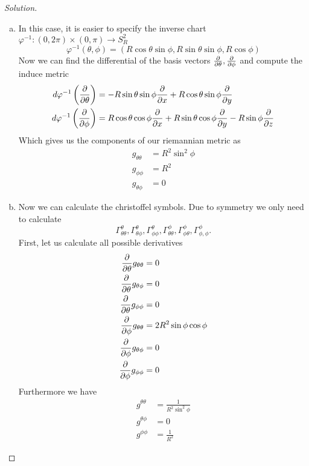 \documentclass[a4paper]{article}
\begin{document}
\begin{proof}[Solution]
  \begin{enumerate}[(a)]
    \item In this case, it is easier to specify the inverse chart $\varphi^{-1}: (0, 2\pi) \times (0, \pi) \rightarrow S_R^2$
      \[
        \varphi^{-1}(\theta, \phi) = (R \cos \theta \sin \phi, R \sin \theta \sin \phi, R \cos \phi)
      \]
  Now we can find the differential of the basis vectors $ \pdv{\theta}, \pdv{\phi}$ and compute the induce metric
  \[
    \begin{aligned}
      d\varphi^{-1} \left( \pdv{\theta} \right) &= -R \sin \theta \sin \phi \pdv{x} + R \cos \theta \sin \phi \pdv{y} \\
      d \varphi^{-1} \left( \pdv{\phi} \right) &= R \cos \theta \cos \phi \pdv{x} + R \sin \theta \cos \phi \pdv{y} - R \sin \phi \pdv{z}
    \end{aligned}
  \]
  Which gives us the components of our riemannian metric as
  \[
    \begin{aligned}
      g_{\theta \theta} &= R^2\sin^2 \phi \\
      g_{\phi \phi} &= R^2  \\
      g_{\theta \phi} &= 0
    \end{aligned}
  \]
\item  
  Now we can calculate the christoffel symbols. Due to symmetry we only need to calculate 
  \[
    \Gamma_{\theta \theta}^\theta, \Gamma_{\theta \phi}^\theta, \Gamma_{\phi \phi}^\theta, \Gamma_{\theta \theta}^\phi, \Gamma_{\phi \theta}^{\phi}, \Gamma_{\phi, \phi}^\phi.
  \] First, let us calculate all possible derivatives
  \[
    \begin{aligned}
      \pdv{\theta} g_{\theta \theta} &= 0 \\
      \pdv{\theta} g_{\theta \phi} &= 0 \\
      \pdv{\theta} g_{\phi \phi} &= 0 \\
      \pdv{\phi} g_{\theta \theta} &= 2R^2 \sin \phi \cos \phi \\
      \pdv{\phi} g_{\theta \phi} &= 0 \\
      \pdv{\phi} g_{\phi \phi} &= 0
    \end{aligned}
  \]
  Furthermore we have
  \[
    \begin{aligned}
      g^{\theta \theta} &= \frac{1}{R^2 \sin^2 \phi} \\
      g^{\theta \phi} &= 0 \\
      g^{\phi \phi} &= \frac{1}{R^2}
    \end{aligned}
\]
\end{enumerate}
\end{proof}
\end{document}
